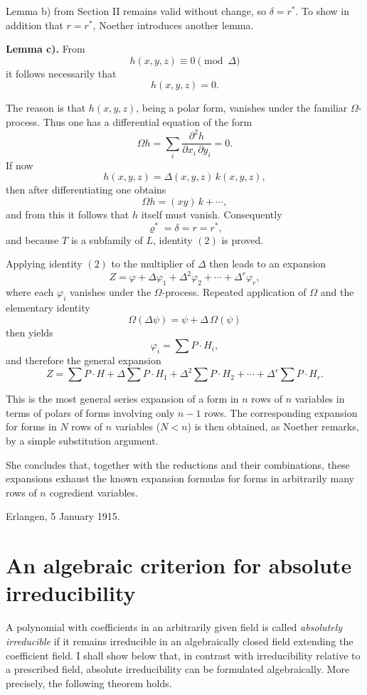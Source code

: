 \documentclass[11pt]{article}
\begin{document}
Lemma b) from Section II remains valid without change, so \(\delta=r^*\). To show in addition that \(r=r^*\), Noether introduces another lemma.

\medskip
\noindent\textbf{Lemma c).}
From
\[
h(x,y,z)\equiv 0 \pmod{\Delta}
\]
it follows necessarily that
\[
h(x,y,z)=0.
\]

The reason is that \(h(x,y,z)\), being a polar form, vanishes under the familiar \(\Omega\)-process. Thus one has a differential equation of the form
\[
\Omega h=\sum_i \frac{\partial^2 h}{\partial x_i\,\partial y_i}=0.
\]
If now
\[
h(x,y,z)=\Delta(x,y,z)\,k(x,y,z),
\]
then after differentiating one obtains
\[
\Omega h=(xy)\,k+\cdots,
\]
and from this it follows that \(h\) itself must vanish. Consequently
\[
\varrho^*=\delta=r=r^*,
\]
and because \(T\) is a subfamily of \(L\), identity \((2)\) is proved.

Applying identity \((2)\) to the multiplier of \(\Delta\) then leads to an expansion
\[
Z=\varphi+\Delta\varphi_1+\Delta^2\varphi_2+\cdots+\Delta^r\varphi_r,
\]
where each \(\varphi_i\) vanishes under the \(\Omega\)-process. Repeated application of \(\Omega\) and the elementary identity
\[
\Omega(\Delta\psi)=\psi+\Delta\,\Omega(\psi)
\]
then yields
\[
\varphi_i=\sum P\cdot H_i,
\]
and therefore the general expansion
\[
Z=
\sum P\cdot H
+\Delta\sum P\cdot H_1
+\Delta^2\sum P\cdot H_2
+\cdots
+\Delta^r\sum P\cdot H_r.
\tag{3}
\]

This is the most general series expansion of a form in \(n\) rows of \(n\) variables in terms of polars of forms involving only \(n-1\) rows. The corresponding expansion for forms in \(N\) rows of \(n\) variables (\(N<n\)) is then obtained, as Noether remarks, by a simple substitution argument.

She concludes that, together with the reductions and their combinations, these expansions exhaust the known expansion formulas for forms in arbitrarily many rows of \(n\) cogredient variables.

\medskip
\noindent
Erlangen, 5 January 1915.

\clearpage
\section*{An algebraic criterion for absolute irreducibility}

A polynomial with coefficients in an arbitrarily given field is called \emph{absolutely irreducible} if it remains irreducible in an algebraically closed field extending the coefficient field. I shall show below that, in contrast with irreducibility relative to a prescribed field, absolute irreducibility can be formulated algebraically. More precisely, the following theorem holds.
\end{document}
